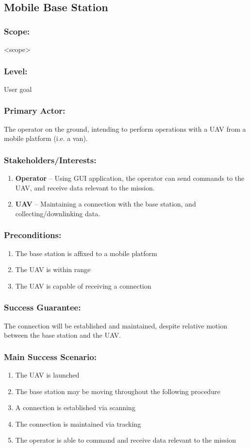 \documentclass[ProductRequirements.tex]{subfiles}
\begin{document}
	\subsection{Mobile Base Station}
	\subsubsection*{Scope:}
	<scope>
	\subsubsection*{Level:}
	User goal
	\subsubsection*{Primary Actor:}
	The operator on the ground, intending to perform operations with a UAV from a mobile platform (i.e. a van).
	\subsubsection*{Stakeholders/Interests:}
	\begin{enumerate}\itemsep1pt
		\item \textbf{Operator} -- Using GUI application, the operator can send commands to the UAV, and receive data relevant to the mission. 
		\item \textbf{UAV} -- Maintaining a connection with the base station, and collecting/downlinking data. 
	\end{enumerate}
	\subsubsection*{Preconditions:}
	\begin{enumerate}\itemsep1pt
		\item The base station is affixed to a mobile platform
		\item The UAV is within range
		\item The UAV is capable of receiving a connection
	\end{enumerate}
	\subsubsection*{Success Guarantee:}
	The connection will be established and maintained, despite relative motion between the base station and the UAV.
	\subsubsection*{Main Success Scenario:}
	\begin{enumerate}\itemsep1pt
		\item The UAV is launched
		\item The base station may be moving throughout the following procedure
		\item A connection is established via scanning
		\item The connection is maintained via tracking
		\item The operator is able to command and receive data relevant to the mission 
	\end{enumerate}
\end{document}
